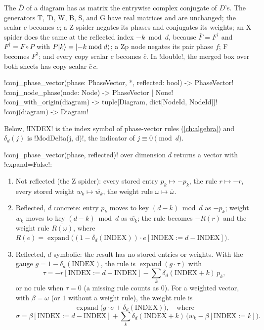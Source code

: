 The  $\overline D$ of a diagram has as matrix the entrywise complex conjugate of $D$'s. The generators T, Ti, W, B, S, and G have real matrices and are unchanged; the scalar $c$ becomes $\bar c$; a Z spider negates its phases and conjugates its weights; an X spider does the same at the reflected index $-k \bmod d$, because $\overline{F}=F^{\dagger}$ and $F^\dagger=F\circ P$ with $P\lvert k \rangle=\lvert -k\bmod d \rangle$; a Zp node negates its pair phase $f$; F becomes $F^3$; and every \bbox{} copy scalar $c$ becomes $\bar c$. In \py!double!, the merged box over both sheets has copy scalar $\bar c\,c$.

\begin{signature}
\py!conj_phase_vector(phase: PhaseVector, *, reflected: bool) -> PhaseVector!\\
\py!conj_node_phase(node: Node) -> PhaseVector | None!\\
\py!conj_with_origin(diagram) -> tuple[Diagram, dict[NodeId, NodeId]]!\\
\py!conj(diagram) -> Diagram!
\end{signature}

Below, \py!INDEX! is the index symbol of phase-vector rules (\cref{ch:algebra}) and $\delta_d(j)$ is \py!ModDelta(j, d)!, the indicator of $j\equiv 0\pmod d$.

\begin{algorithm}\label{alg:mixed-conj-phase}
\py!conj_phase_vector(phase, reflected)! over dimension $d$ returns a vector with \py!expand=False!:
\begin{enumerate}
\item Not reflected (the Z spider): every stored entry $p_k\mapsto -p_k$, the rule $r\mapsto -r$, every stored weight $w_k\mapsto\overline{w_k}$, the weight rule $\omega\mapsto\overline\omega$.
\item Reflected, $d$ concrete: entry $p_k$ moves to key $(d-k)\bmod d$ as $-p_k$; weight $w_k$ moves to key $(d-k)\bmod d$ as $\overline{w_k}$; the rule becomes $-R(r)$ and the weight rule $\overline{R(\omega)}$, where $R(e)=\operatorname{expand}\bigl((1-\delta_d(\mathrm{INDEX}))\cdot e[\mathrm{INDEX}:=d-\mathrm{INDEX}]\bigr)$.
\item Reflected, $d$ symbolic: the result has no stored entries or weights. With the gauge $g=1-\delta_d(\mathrm{INDEX})$, the rule is $\operatorname{expand}(g\cdot\tau)$ with
\[
\tau = -r[\mathrm{INDEX}:=d-\mathrm{INDEX}] - \sum_k \delta_d(\mathrm{INDEX}+k)\,p_k,
\]
or no rule when $\tau=0$ (a missing rule counts as $0$). For a weighted vector, with $\beta=\omega$ (or $1$ without a weight rule), the weight rule is
\[
\overline{\operatorname{expand}\bigl(g\cdot\sigma + \delta_d(\mathrm{INDEX})\bigr)},\quad\text{where}
\]
\[
\sigma=\beta[\mathrm{INDEX}:=d-\mathrm{INDEX}] + \sum_k \delta_d(\mathrm{INDEX}+k)\,\bigl(w_k-\beta[\mathrm{INDEX}:=k]\bigr).
\]
\end{enumerate}
\end{algorithm}

